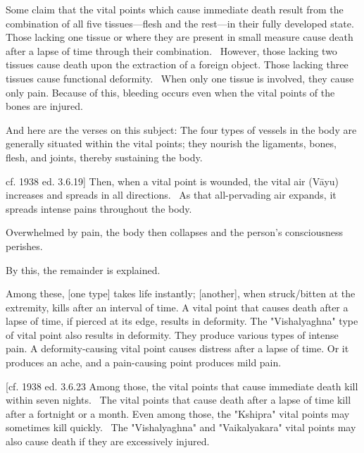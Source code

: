 \begin{translation}
\begin{tt}
\item[17]
Some claim that the vital points which cause immediate death result from the combination of all five tissues—flesh and the rest—in their fully developed state. 
Those lacking one tissue or where they are present in small measure cause death after a lapse of time through their combination. 
However, those lacking two tissues cause death upon the extraction of a foreign object.
Those lacking three tissues cause functional deformity. 
When only one tissue is involved, they cause only pain.
Because of this, bleeding occurs even when the vital points of the bones are injured.


\item[18]
And here are the verses on this subject:
The four types of vessels in the body are generally situated within the vital points; they nourish the ligaments, bones, flesh, and joints, thereby sustaining the body.


cf. 1938 ed. 3.6.19]
Then, when a vital point is wounded, the vital air (Vāyu) increases and spreads in all directions. 
As that all-pervading air expands, it spreads intense pains throughout the body. 

\item[20]
Overwhelmed by pain, the body then collapses and the person's consciousness perishes.

\item[21]
By this, the remainder is explained.

\item[22]
Among these, [one type] takes life instantly; [another], when struck/bitten at the extremity, kills after an interval of time. A vital point that causes death after a lapse of time, if pierced at its edge, results in deformity. The "Vishalyaghna" type of vital point also results in deformity. They produce various types of intense pain. A deformity-causing vital point causes distress after a lapse of time. Or it produces an ache, and a pain-causing point produces mild pain.

[cf. 1938 ed. 3.6.23
Among those, the vital points that cause immediate death kill within seven nights. 
The vital points that cause death after a lapse of time kill after a fortnight or a month.
Even among those, the "Kshipra" vital points may sometimes kill quickly. 
The "Vishalyaghna" and "Vaikalyakara" vital points may also cause death if they are excessively injured.

\item[24]


\end{tt}
\end{translation}
